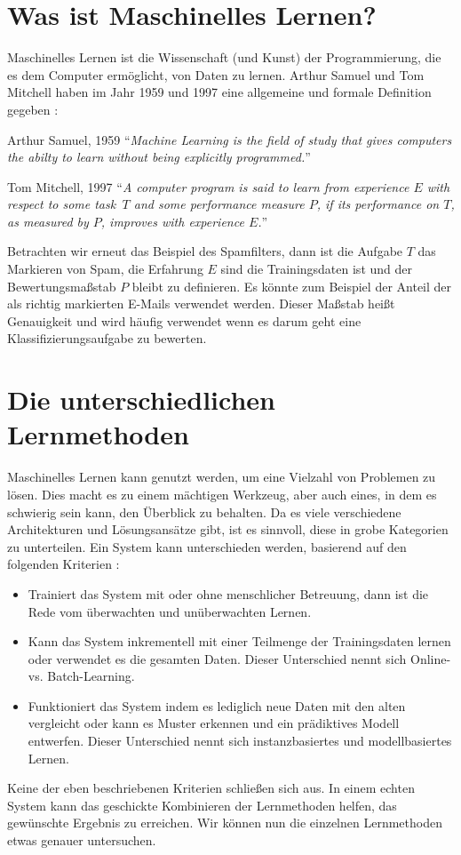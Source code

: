 \section{Was ist Maschinelles Lernen?}
Maschinelles Lernen ist die Wissenschaft (und Kunst) der Programmierung,
die es dem Computer ermöglicht, von Daten zu lernen. Arthur Samuel und Tom Mitchell
haben im Jahr 1959 und 1997 eine allgemeine und formale Definition gegeben \parencite[2]{book:hands-on-ml}:
\begin{aquote}{Arthur Samuel, 1959}
  \enquote{\textit{Machine Learning is the field of study that gives computers
      the abilty to learn without being explicitly programmed.}}
\end{aquote}
\begin{aquote}{Tom Mitchell, 1997}
  \enquote{\textit{A computer program is said to learn from experience
      $E$ with respect to some task \,$T$ and some performance measure $P$,
      if its performance on $T$, as measured by $P$, improves with experience $E$.}}
\end{aquote}
Betrachten wir erneut das Beispiel des Spamfilters, dann ist die Aufgabe $T$
das Markieren von Spam, die Erfahrung
$E$ sind die Trainingsdaten ist und der Bewertungsmaßstab $P$ bleibt zu definieren.
Es könnte zum Beispiel der Anteil der als richtig markierten E-Mails verwendet
werden. Dieser Maßstab heißt Genauigkeit und wird
häufig verwendet wenn es darum geht eine Klassifizierungsaufgabe zu bewerten.

\section{Die unterschiedlichen Lernmethoden}
\label{sec:lernmethoden}
Maschinelles Lernen kann genutzt werden, um eine Vielzahl von Problemen zu lösen.
Dies macht es zu einem mächtigen Werkzeug, aber auch eines, in dem es schwierig sein
kann, den Überblick zu behalten.
Da es viele verschiedene Architekturen und Lösungsansätze gibt, ist es sinnvoll,
diese in grobe Kategorien zu unterteilen.
Ein System kann unterschieden werden, basierend auf den folgenden
Kriterien \parencite[7]{book:hands-on-ml}:
\begin{itemize}
  \item Trainiert das System mit oder ohne menschlicher Betreuung, dann ist
        die Rede vom überwachten und unüberwachten Lernen.
  \item Kann das System inkrementell mit einer Teilmenge der Trainingsdaten
        lernen oder verwendet es die gesamten Daten. Dieser Unterschied
        nennt sich Online- vs. Batch-Learning.
  \item Funktioniert das System indem es lediglich neue Daten mit
        den alten vergleicht oder kann es Muster erkennen
        und ein prädiktives Modell entwerfen.
        Dieser Unterschied nennt sich instanzbasiertes und modellbasiertes Lernen.
\end{itemize}
Keine der eben beschriebenen Kriterien schließen sich aus.
In einem echten System kann das geschickte Kombinieren der
Lernmethoden helfen, das gewünschte Ergebnis zu erreichen.
Wir können nun die einzelnen Lernmethoden etwas genauer untersuchen.


